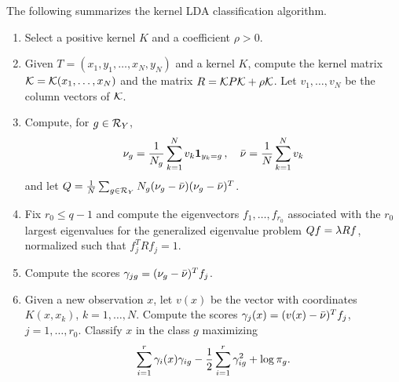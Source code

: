 The following summarizes the kernel LDA classification algorithm.
\begin{algorithm}
\label{alg:k.lda}
\begin{enumerate}[label=(\arabic*)]
\item Select a positive kernel $K$ and a coefficient $\rho >0$.
\item Given $T = (x_1, y_1, \ldots, x_N, y_N)$ and a kernel $K$, compute the kernel matrix ${\mathcal K} = {\mathcal K}(x_1, \ldots, x_N)$ and the matrix $R = {\mathcal K} P{\mathcal K} + \rho {\mathcal K}$. Let $v_1, \ldots, v_N$ be the column vectors of ${\mathcal K}$.
\item Compute, for $g\in {\mathcal R}_Y$, 
\[
\nu_g = \frac1{N_g} \sum_{k=1}^N v_k {\bm 1}_{y_k=g}\, ,
\quad
\bar\nu = \frac1N \sum_{k=1}^N v_k
\]
and let $Q = \frac1N \sum_{g\in {\mathcal R}_Y} N_g (\nu_g-\bar\nu)(\nu_g-\bar\nu)^T$.
\item Fix $r_0 \leq q-1$ and compute the eigenvectors $f_1, \ldots, f_{r_0}$ associated with the $r_0$ largest eigenvalues for the generalized eigenvalue problem $Qf = \lambda Rf$, normalized such that $f_j^T R f_j = 1$.
\item Compute the scores $\gamma_{jg} = (\nu_g-\bar\nu)^Tf_j$.
\item Given a new observation $x$, let $v(x)$ be the vector with coordinates $K(x,x_k)$, $k=1, \ldots, N$. Compute the scores $\gamma_j(x) = (v(x) - \bar\nu)^T f_j$, $j=1, \ldots, r_0$. Classify $x$ in the class $g$ maximizing 
\begin{equation}
\label{eq:klda.final}
\sum_{i=1}^r \gamma_i(x) \gamma_{ig} - \frac12 \sum_{i=1}^r \gamma_{ig}^2  + \log\pi_g.
\end{equation}
\end{enumerate}
\end{algorithm}




